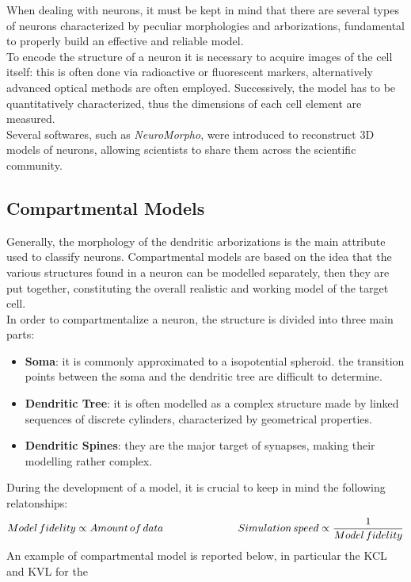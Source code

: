 When dealing with neurons, it must be kept in mind that there are several types of
neurons characterized by peculiar morphologies and arborizations, fundamental
to properly build an effective and reliable model.\\
To encode the structure of a neuron it is necessary to acquire images of the cell itself:
this is often done via radioactive or fluorescent markers, alternatively advanced optical
methods are often employed. Successively, the model has to be quantitatively characterized,
thus the dimensions of each cell element are measured.\\
Several softwares, such as \textit{NeuroMorpho}, were introduced to reconstruct 3D models of
neurons, allowing scientists to share them across the scientific community.

\subsection{Compartmental Models}
Generally, the morphology of the dendritic arborizations is the main attribute used to classify
neurons. Compartmental models are based on the idea that the various structures found in
a neuron can be modelled separately, then they are put together, constituting the
overall realistic and working model of the target cell.\\
In order to compartmentalize a neuron, the structure is divided into three main parts:
\begin{itemize}
    \item \textbf{Soma}: it is commonly approximated to a isopotential spheroid. the
          transition points between the soma and the dendritic tree are difficult to determine.
    \item \textbf{Dendritic Tree}: it is often modelled as a complex structure made by
          linked sequences of discrete cylinders, characterized by geometrical properties.
    \item  \textbf{Dendritic Spines}: they are the major target of synapses, making their
          modelling rather complex.
\end{itemize}
During the development of a model, it is crucial to keep in mind the following relatonships:
\begin{equation*}
    {Model\,fidelity}\propto{Amount\,of\,data}
    \hspace{2.5cm}
    {Simulation\,speed}\propto{\frac{1}{Model\,fidelity}}
\end{equation*}
An example of compartmental model is reported below, in particular the KCL and KVL for the
